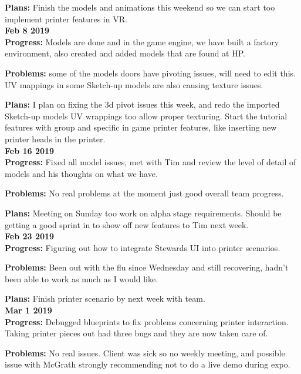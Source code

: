 \textbf{Plans:}
Finish the models and animations this weekend so we can start too implement printer features in VR.\\

\textbf{Feb 8 2019}\\
\textbf{Progress:}
Models are done and in the game engine, we have built a factory environment, also created and added models that are found at HP. 

\textbf{Problems:} 
some of the models doors have pivoting issues, will need to edit this. UV mappings in some Sketch-up models are also causing texture issues. 

\textbf{Plans:} 
I plan on fixing the 3d pivot issues this week, and redo the imported Sketch-up models UV wrappings too allow proper texturing. Start the tutorial features with group and specific in game printer features, like inserting new printer heads in the printer.\\

\textbf{Feb 16 2019}\\

\textbf{Progress:}
Fixed all model issues, met with Tim and review the level of detail of models and his thoughts on what we have.

\textbf{Problems:} 
No real problems at the moment just good overall team progress.

\textbf{Plans:} 
Meeting on Sunday too work on alpha stage requirements. Should be getting a good sprint in to show off new features to Tim next week.\\

\textbf{Feb 23 2019}\\
\textbf{Progress:}
Figuring out how to integrate Stewards UI into printer scenarios.

\textbf{Problems:} 
Been out with the flu since Wednesday and still recovering, hadn't been able to work as much as I would like.

\textbf{Plans:}
Finish printer scenario by next week with team.\\

\textbf{Mar 1 2019}\\
\textbf{Progress:} 
Debugged blueprints to fix problems concerning printer interaction. Taking printer pieces out had three bugs and they are now taken care of.

\textbf{Problems:} 
No real issues. Client was sick so no weekly meeting, and possible issue with McGrath strongly recommending not to do a live demo during expo.

